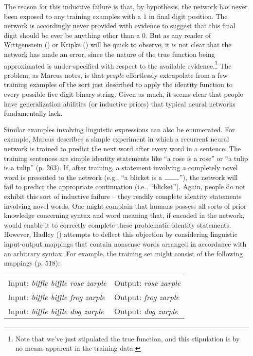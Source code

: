 The reason for this inductive failure is that, by hypothesis, the network has never been exposed to any training examples with a $1$ in final digit position. The network is accordingly never provided with evidence to suggest that this final digit should be ever be anything other than a $0$. But as any reader of Wittgenstein (\citeyear{Wittgenstein:1953}) or Kripke (\citeyear{Kripke:1982}) will be quick to observe, it is not clear that the network has made an error, since the nature of the true function being approximated is under-specified with respect to the available evidence.\footnote{Note that we've just stipulated the true function, and this stipulation is by no means apparent in the training data.} The problem, as Marcus notes, is that \textit{people} effortlessly extrapolate from a few training examples of the sort just described to apply the identity function to every possible five digit binary string. Given as much, it seems clear that people have generalization abilities (or inductive priors) that typical neural networks fundamentally lack.

Similar examples involving linguistic expressions can also be enumerated. For example, Marcus describes a simple experiment in which a recurrent neural network is trained to predict the next word after every word in a sentence. The training sentences are simple identity statements like ``a rose is a rose'' or ``a tulip is a tulip'' (p. 263). If, after training, a statement involving a completely novel word is presented to the network (e.g., ``a blicket is a $\rule{0.75cm}{0.15mm}$''), the network will fail to predict the appropriate continuation (i.e., ``blicket''). Again, people do not exhibit this sort of inductive failure -- they readily complete identity statements involving novel words. One might complain that humans possess all sorts of prior knowledge concerning syntax and word meaning that, if encoded in the network, would enable it to correctly complete these problematic identity statements. However, Hadley (\citeyear{Hadley:2009}) attempts to deflect this objection by considering linguistic input-output mappings that contain nonsense words arranged in accordance with an arbitrary syntax. For example, the training set might consist of the following mappings (p. 518):

\vskip 0.12in
\begin{tabular}{l l} 
Input: \textit{biffle biffle rose zarple}  & Output: \textit{rose zarple} \\
Input: \textit{biffle biffle frog zarple } & Output: \textit{frog zarple} \\
Input: \textit{biffle biffle dog zarple} & Output: \textit{dog zarple} \\
\end{tabular} 
\vskip 0.12in

